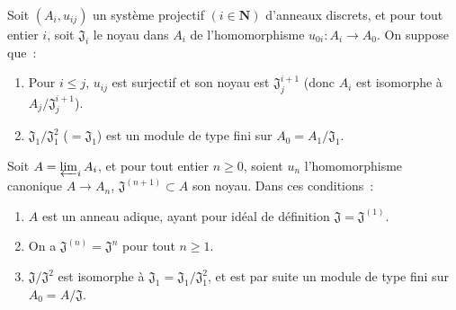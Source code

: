 \begin{proposition}[7.2.7]
\label{0.7.2.7-fr}
Soit $(A_i,u_{ij})$ un système projectif $(i\in\mathbf N)$ d'anneaux discrets,
et pour tout entier $i$, soit $\mathfrak J_i$ le noyau dans $A_i$ de
l'homomorphisme $u_{0i}:A_i\to A_0$. On suppose que~:
\begin{enumerate}
  \item[$a)$] Pour $i\leq j$, $u_{ij}$ est surjectif et son noyau est
    $\mathfrak J_j^{i+1}$ (donc $A_i$ est isomorphe à
    $A_j/\mathfrak J_j^{i+1}$).
  \item[$b)$] $\mathfrak J_1/\mathfrak J_1^2$ ($=\mathfrak J_1$) est un
    module de type fini sur $A_0=A_1/\mathfrak J_1$.
\end{enumerate}
Soit $A=\varprojlim_i A_i$, et pour tout entier $n\geq0$, soient $u_n$
l'homomorphisme canonique $A\to A_n$, $\mathfrak J^{(n+1)}\subset A$ son
noyau. Dans ces conditions~:
\begin{enumerate}
  \item[(i)] $A$ est un anneau adique, ayant pour idéal de définition
    $\mathfrak J=\mathfrak J^{(1)}$.
  \item[(ii)] On a $\mathfrak J^{(n)}=\mathfrak J^n$ pour tout $n\geq1$.
  \item[(iii)] $\mathfrak J/\mathfrak J^2$ est isomorphe à
    $\mathfrak J_1=\mathfrak J_1/\mathfrak J_1^2$, et est par suite un module
    de type fini sur $A_0=A/\mathfrak J$.
\end{enumerate}
\end{proposition}

